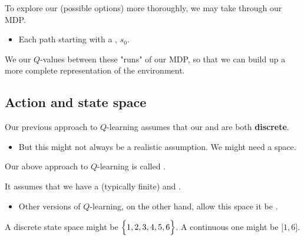         \begin{concept}
            To explore our  (possible options) more thoroughly, we may take  through our MDP.

            \begin{itemize}
                \item Each path starting with a , $s_0$.
            \end{itemize}

            We  our $Q$-values between these "runs" of our MDP, so that we can build up a more complete representation of the environment.
        \end{concept}


    \phantom{}

    \subsection{Action and state space}

        Our previous approach to $Q$-learning assumes that our  and  are both \textbf{discrete}.

        \begin{itemize}
            \item But this might not always be a realistic assumption. We might need a  space.\\
        \end{itemize}

        \begin{concept}
            Our above approach to $Q$-learning is called . 

            It assumes that we have a  (typically finite)  and .

            \begin{itemize}
                \item Other versions of $Q$-learning, on the other hand, allow this space it be .
            \end{itemize}
        \end{concept}


        \miniex A discrete state space might be $\Bigl\{1,2,3,4,5,6\Bigr\}$. A continuous one might be $\big[1,6\big]$.

